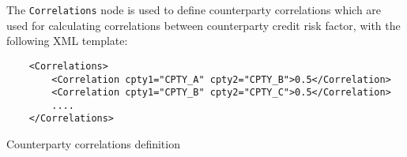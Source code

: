 The \lstinline!Correlations! node is used to define counterparty correlations which are
used for calculating correlations between counterparty credit risk factor, with the following
XML template:

\begin{listing}[H]
\begin{verbatim}
    <Correlations>
        <Correlation cpty1="CPTY_A" cpty2="CPTY_B">0.5</Correlation>
        <Correlation cpty1="CPTY_B" cpty2="CPTY_C">0.5</Correlation>
        ....
    </Correlations>
\end{verbatim}
\caption{Counterparty correlations definition}
\label{lst:counterparty_correlations}
\end{listing}
